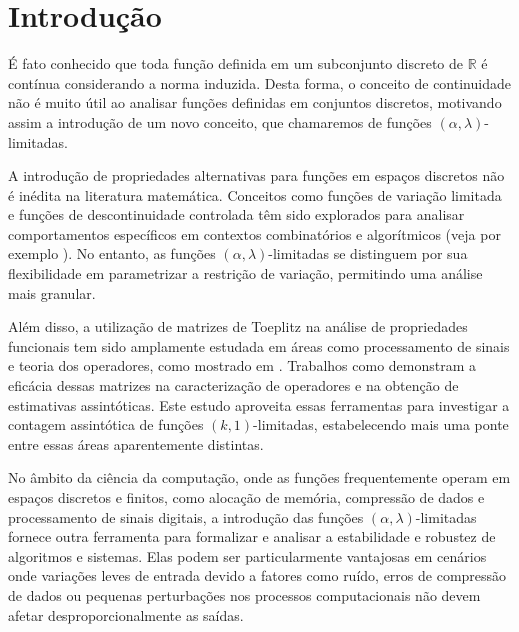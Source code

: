 \section*{Introdução}
\vspace{1cm}

\normalsize

É fato conhecido que toda função definida em um subconjunto discreto de $\mathbb{R}$ é contínua considerando a norma induzida. Desta forma, o conceito de continuidade não é muito útil ao analisar funções definidas em conjuntos discretos, motivando assim a introdução de um novo conceito, que chamaremos de funções $(\alpha,\lambda)$-limitadas.

A introdução de propriedades alternativas para funções em espaços discretos não é inédita na literatura matemática. Conceitos como funções de variação limitada e funções de descontinuidade controlada têm sido explorados para analisar comportamentos específicos em contextos combinatórios e algorítmicos (veja por exemplo \cite{Rosenfeld}). No entanto, as funções $(\alpha,\lambda)$-limitadas se distinguem por sua flexibilidade em parametrizar a restrição de variação, permitindo uma análise mais granular.

Além disso, a utilização de matrizes de Toeplitz na análise de propriedades funcionais tem sido amplamente estudada em áreas como processamento de sinais e teoria dos operadores, como mostrado em \cite{GrenanderSzego}. Trabalhos como \cite{bottcher} demonstram a eficácia dessas matrizes na caracterização de operadores e na obtenção de estimativas assintóticas. Este estudo aproveita essas ferramentas para investigar a contagem assintótica de funções $(k,1)$-limitadas, estabelecendo mais uma ponte entre essas áreas aparentemente distintas.

No âmbito da ciência da computação, onde as funções frequentemente operam em espaços discretos e finitos, como alocação de memória, compressão de dados e processamento de sinais digitais, a introdução das funções $(\alpha,\lambda)$-limitadas fornece outra ferramenta para formalizar e analisar a estabilidade e robustez de algoritmos e sistemas. Elas podem ser particularmente vantajosas em cenários onde variações leves de entrada devido a fatores como ruído, erros de compressão de dados ou pequenas perturbações nos processos computacionais não devem afetar desproporcionalmente as saídas.

